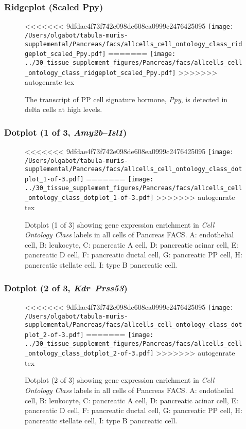 \clearpage

\subsubsection{Ridgeplot (Scaled Ppy)}
\begin{figure}[h]
\centering
<<<<<<< 9dfdae4f73f742e098de608ea0999c2476425095
\texttt{[image: /Users/olgabot/tabula-muris-supplemental/Pancreas/facs/allcells\_cell\_ontology\_class\_ridgeplot\_scaled\_Ppy.pdf]}
=======
\texttt{[image: ../30\_tissue\_supplement\_figures/Pancreas/facs/allcells\_cell\_ontology\_class\_ridgeplot\_scaled\_Ppy.pdf]}
>>>>>>> autogenrate tex

\caption{The transcript of PP cell signature hormone, \emph{Ppy}, is detected in delta cells at high levels.
}
\end{figure}


\clearpage

\subsubsection{Dotplot (1 of 3, \emph{Amy2b}--\emph{Isl1})}
\begin{figure}[h]
\centering
<<<<<<< 9dfdae4f73f742e098de608ea0999c2476425095
\texttt{[image: /Users/olgabot/tabula-muris-supplemental/Pancreas/facs/allcells\_cell\_ontology\_class\_dotplot\_1-of-3.pdf]}
=======
\texttt{[image: ../30\_tissue\_supplement\_figures/Pancreas/facs/allcells\_cell\_ontology\_class\_dotplot\_1-of-3.pdf]}
>>>>>>> autogenrate tex

\caption{ Dotplot (1 of 3)  showing gene expression enrichment in \emph{Cell Ontology Class} labels in all cells of Pancreas FACS. A: endothelial cell, B: leukocyte, C: pancreatic A cell, D: pancreatic acinar cell, E: pancreatic D cell, F: pancreatic ductal cell, G: pancreatic PP cell, H: pancreatic stellate cell, I: type B pancreatic cell.}
\end{figure}


\clearpage

\subsubsection{Dotplot (2 of 3, \emph{Kdr}--\emph{Prss53})}
\begin{figure}[h]
\centering
<<<<<<< 9dfdae4f73f742e098de608ea0999c2476425095
\texttt{[image: /Users/olgabot/tabula-muris-supplemental/Pancreas/facs/allcells\_cell\_ontology\_class\_dotplot\_2-of-3.pdf]}
=======
\texttt{[image: ../30\_tissue\_supplement\_figures/Pancreas/facs/allcells\_cell\_ontology\_class\_dotplot\_2-of-3.pdf]}
>>>>>>> autogenrate tex

\caption{ Dotplot (2 of 3)  showing gene expression enrichment in \emph{Cell Ontology Class} labels in all cells of Pancreas FACS. A: endothelial cell, B: leukocyte, C: pancreatic A cell, D: pancreatic acinar cell, E: pancreatic D cell, F: pancreatic ductal cell, G: pancreatic PP cell, H: pancreatic stellate cell, I: type B pancreatic cell.}
\end{figure}


